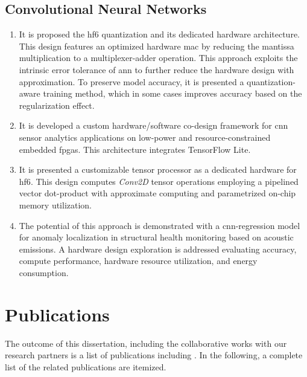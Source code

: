 \subsection{Convolutional Neural Networks}
\begin{enumerate}
	\item
	
	It is proposed the \gls{hf6} quantization and its dedicated hardware architecture. This design features an optimized hardware \gls{mac} by reducing the mantissa multiplication to a multiplexer-adder operation. This approach exploits the intrinsic error tolerance of \gls{ann} to further reduce the hardware design with approximation. To preserve model accuracy, it is presented a quantization-aware training method, which in some cases improves accuracy based on the regularization effect.
	
	\item It is developed a custom hardware/software co-design framework for \gls{cnn} sensor analytics applications on low-power and resource-constrained embedded \glspl{fpga}. This architecture integrates TensorFlow Lite.
	
	\item It is presented a customizable tensor processor as a dedicated hardware for \gls{hf6}. This design computes \emph{Conv2D} tensor operations employing a pipelined vector dot-product with approximate computing and parametrized on-chip memory utilization.
	
	\item The potential of this approach is demonstrated with a \gls{cnn}-regression model for anomaly localization in structural health monitoring based on acoustic emissions. A hardware design exploration is addressed evaluating accuracy, compute performance, hardware resource utilization, and energy consumption.
\end{enumerate}

\section{Publications}
The outcome of this dissertation, including the collaborative works with our research partners is a list of publications including \cite{nevarez2020accelerator, nevarez2021accelerating, yn2022cnnsensor}. In the following, a complete list of the related publications are itemized.

